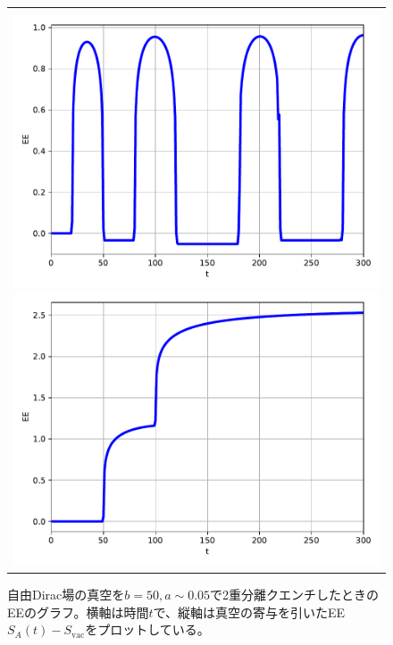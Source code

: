 \begin{figure}[H]
\begin{tabular}{c}
\begin{minipage}{0.50\hsize}
		\end{minipage}
		\begin{minipage}{0.06\hsize}
			\vspace{10mm}
		\end{minipage} \\
		\begin{minipage}{0.50\hsize}
			\centering
			\includegraphics[width=\linewidth]{dd528_30_100.pdf}
		\end{minipage}
		\begin{minipage}{0.50\hsize}
			\centering
			\includegraphics[width=\linewidth]{dd528_150_100.pdf}
		\end{minipage}
	\end{tabular}
	\caption{自由Dirac場の真空を$b=50,a\sim 0.05$で2重分離クエンチしたときのEEのグラフ。横軸は時間$t$で、縦軸は真空の寄与を引いたEE $S_A(t)-S_\text{vac}$をプロットしている。}
	\label{fig:dd528}
\end{figure}

